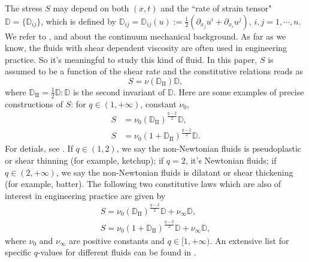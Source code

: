 \documentclass[reqno]{amsart}
\theoremstyle{definition}
\theoremstyle{remark}
\numberwithin{equation}{section} \allowdisplaybreaks
\begin{document}
The stress $S$ may depend on both $(x,t)$ and the ``rate of strain
tensor" $\mathbb{D}=\{\mathbb{D}_{ij}\}$, which is defined by
$\mathbb{D}_{ij}=\mathbb{D}_{ij}(u):=\frac{1}{2}(\partial_{x_j}u^i+\partial_{x_i}u^j)$,
$i,j=1,\cdots ,n$. We refer to \cite{GAGM}, \cite{GKB} and \cite{HL}
about the continuum mechanical background. As far as we know, the
fluids with shear dependent viscosity are often used in engineering
practice.  So it's meaningful to study this kind of fluid. In this
paper, $S$ is assumed to be a function of the shear rate and the
constitutive relations reads as
$$S=\nu(\mathbb{D}_{\text{II}})\mathbb{D},$$ where
$\mathbb{D}_{\text{II}}=\frac{1}{2}\mathbb{D}:\mathbb{D}$ is the
second invariant of $\mathbb{D}$. Here are some examples of precise
constructions of $S$: for $q\in (1,+\infty)$, constant $\nu_0$,
\begin{align*}
S&=\nu_0(\mathbb{D}_{\text{II}})^{\frac{q-2}{2}}\mathbb{D},\\
S&=\nu_0(1+\mathbb{D}_{\text{II}})^{\frac{q-2}{2}}\mathbb{D}.
\end{align*}
For detials, see \cite{GAGM, RBBRCAOH, WLW}. If $q\in(1,2)$, we say
the non-Newtonian fluids is pseudoplastic or shear thinning (for
example, ketchup); if $q=2$, it's Newtonian fluids; if
$q\in(2,+\infty)$, we say the non-Newtonian fluids is dilatant or
shear thickening (for example, batter). The following two
constitutive laws which are also of interest in engineering practice
are given by
\begin{align*}S=\nu_0(\mathbb{D}_{\text{II}})^{\frac{q-2}{2}}\mathbb{D}+\nu_{\infty}\mathbb{D},\quad\\
S=\nu_0(1+\mathbb{D}_{\text{II}})^{\frac{q-2}{2}}\mathbb{D}+\nu_{\infty}\mathbb{D},
\end{align*}
where $\nu_0$ and $\nu_{\infty}$ are positive constants and $q\in
[1,+\infty)$. An extensive list for specific $q$-values for
different fluids can be found in \cite{RBBRCAOH}.
\end{document}
